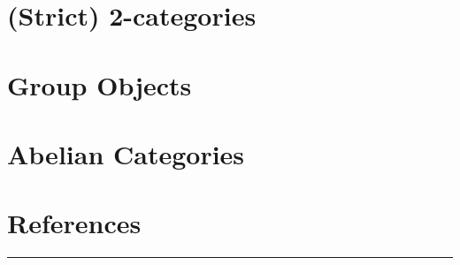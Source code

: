 \section{(Strict) $\mathbold{2}$-categories}\label{appendixa}

\newpage

\section{Group Objects}\label{appendixb}

\newpage

\section{Abelian Categories}\label{appendixc}

\newpage


\section*{References}

%
\vspace*{5em}
%
\centering
\hrule
\vspace*{\fill}

